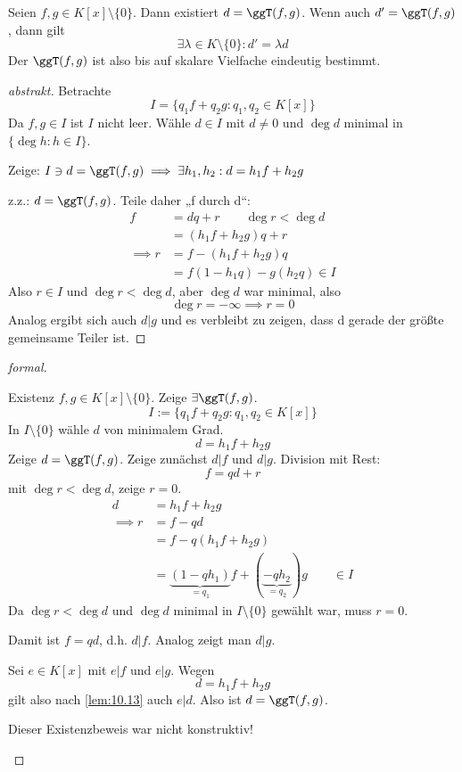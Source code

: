 \documentclass[a4paper, 10pt]{scrbook}
\begin{document}
\begin{prop}
\label{prop:12.3}
Seien $f,g\in K[x]\setminus\{0\}$.
Dann existiert $d=\ggT(f,g)$.
Wenn auch $d'=\ggT(f,g)$, dann gilt
\[
\exists \lambda \in K\setminus\{0\}:d'=\lambda d
\]
Der $\ggT(f,g)$ ist also bis auf skalare Vielfache eindeutig bestimmt.

\begin{proof}[abstrakt]
Betrachte
\[
I=\{q_1f+q_2g:q_1,q_2\in K[x]\}
\]
Da $f,g\in I$ ist $I$ nicht leer.
Wähle $d\in I$ mit $d\neq 0$ und $\deg d$ minimal in $\{\deg h:h\in I\}$.

Zeige: $I\ni d=\ggT(f,g) \implies \exists h_1,h_2 : d=h_1f+h_2g$

z.z.: $d=\ggT(f,g)$.
Teile daher „f durch d“:
\begin{align*}
f&=dq + r \qquad \deg r < \deg d\\
&=(h_1f + h_2g)q + r\\
\implies r&= f-(h_1f+h_2g)q\\
&= f(1-h_1q) - g(h_2q) \in I
\end{align*}
Also $r\in I$ und $\deg r < \deg d$, aber $\deg d$ war minimal, also
\[
\deg r = -\infty \implies r=0
\]
Analog ergibt sich auch $d|g$ und es verbleibt zu zeigen, dass d gerade der größte gemeinsame Teiler ist.

\end{proof}

\begin{proof}[formal]
	\begin{seg}{Existenz}
$f,g\in K[x] \setminus \{0\}$. Zeige $\exists \ggT(f,g)$.
\[
I := \{q_1f+q_2g:q_1,q_2\in K[x]\}
\]
In $I\setminus \{0\}$ wähle $d$ von minimalem Grad.
\[
d=h_1f +h_2g
\]
Zeige $d=\ggT(f,g)$.
Zeige zunächst $d|f$ und $d|g$.
Division mit Rest:
\[
f=qd+r
\]
mit $\deg r < \deg d$, zeige $r=0$.
\begin{align*}
d&=h_1f+h_2g \\
\implies r&=f-qd \\
			 &= f-q(h_1f+h_2g)\\
	   &= \underbrace{(1-qh_1)}_{=q_1}f + (\underbrace{-qh_2}_{=q_2}) g \qquad \in I
\end{align*}
Da $\deg r < \deg d$ und $\deg d$ minimal in $I\setminus \{0\}$ gewählt war, muss $r=0$.

Damit ist $f=qd$, d.h. $d|f$.
Analog zeigt man $d|g$.

Sei $e\in K[x]$ mit $e|f$ und $e|g$.
Wegen
\[
d=h_1f+h_2g
\]
gilt also nach \ref{lem:10.13} auch $e|d$.
Also ist $d=\ggT(f,g)$.
\end{seg}
\begin{note}
Dieser Existenzbeweis war nicht konstruktiv!
\end{note}


\end{proof}
\end{prop}
\end{document}
